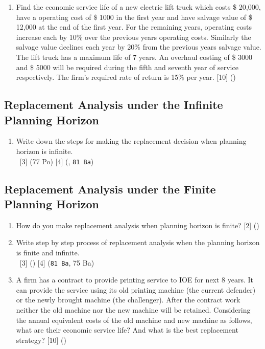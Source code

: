 \documentclass[12pt]{article}
\newcommand{\enter}{\\\textcolor{white}{1}}
\begin{document}
\begin{enumerate}
			\item Find the economic service life of a new electric lift truck which costs \$ 20,000, have a operating cost of \$ 1000 in the first year and have salvage value of \$ 12,000 at the end of the first year. For the remaining years,  operating costs increase each by 10\% over the previous years operating costs. Similarly the salvage value declines each year by 20\% from the previous years salvage value. The lift truck has a maximum life of 7 years. An overhaul costing of \$ 3000 and \$ 5000 will be required during the fifth and seventh year of service respectively. The firm's required rate of return is 15\% per year. \hfill [10] ()
		\end{enumerate}

	\subsection{Replacement Analysis under the Infinite Planning Horizon}
		\begin{enumerate}
			\item Write down the steps for making the replacement decision when planning horizon is infinite.
			\enter\hfill [3] (77 Po) [4] (, \texttt{81 Ba})
		\end{enumerate}

		\subsection{Replacement Analysis under the Finite Planning Horizon}
			\begin{enumerate}
				\item How do you make replacement analysis when planning horizon is finite? \hfill [2] ()

				\item Write step by step process of replacement analysis when the planning horizon is finite and infinite.
				\enter\hfill [3] () [4] (\texttt{81 Ba}, 75 Ba)

				\item A firm has a contract to provide printing service to IOE for next 8 years. It can provide the service using its old printing machine (the current defender) or the newly brought machine (the challenger). After the contract work neither the old machine nor the new machine will be retained. Considering the annual equivalent costs of the old machine and new machine as follows, what are their economic service life? And what is the best replacement strategy? \hfill [10] ()
			\end{enumerate}
\end{document}
